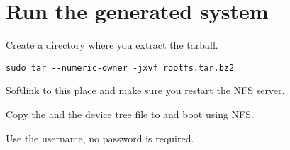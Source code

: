 \section{Run the generated system}

Create a directory where you extract the tarball.

\begin{verbatim}
sudo tar --numeric-owner -jxvf rootfs.tar.bz2
\end{verbatim}

Softlink  to this place and make sure you restart the NFS server.

Copy the  and the device tree file to 
and boot using NFS.

Use the  username, no password is required.





